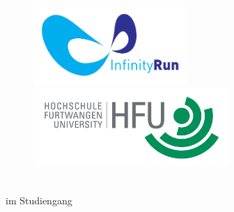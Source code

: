 \begin{titlepage}
\pagestyle{empty}

\begin{figure}[htb]
	\flushleft
	\begin{minipage}{0.45\linewidth}
		\flushleft
		\includegraphics[height=3cm]{../../image/logo.png}
		\vspace{30pt}
	\end{minipage}
	\begin{minipage}{0.45\linewidth}
		\flushright
		\includegraphics[height=3cm]{content/pictures/hfu.jpg}
		\vspace{30pt}
	\end{minipage}
\end{figure}
\begin{center}
\vspace{2.25cm}
{\fontsize{18}{22} \selectfont \docArtDerArbeit}\\[5mm]
{\fontsize{18}{22} \selectfont im Studiengang} \\[5mm]
{\fontsize{18}{22} \selectfont \docStudiengang}\\
\vspace{1cm}
\begin{onehalfspace}
{\fontsize{22}{26} \selectfont \textbf{\docTitle}}\\[5mm]
{\fontsize{18}{22} \selectfont \docUntertitle}
\end{onehalfspace}
\end{center}


\end{titlepage}
